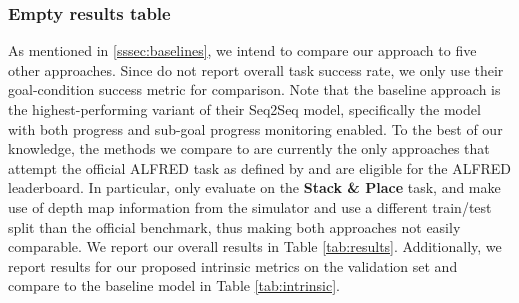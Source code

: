 \documentclass[11pt,a4paper]{article}
\begin{document}
\subsubsection{Empty results table}
As mentioned in \ref{sssec:baselines}, we intend to compare our approach to five other approaches. Since  do not report overall task success rate, we only use their goal-condition success metric for comparison. Note that the baseline approach is the highest-performing variant of their Seq2Seq model, specifically the model with both progress and sub-goal progress monitoring enabled. To the best of our knowledge, the methods we compare to are currently the only approaches that attempt the official ALFRED task as defined by  and are eligible for the ALFRED leaderboard.  In particular,  only evaluate on the \textbf{Stack \& Place} task, and  make use of depth map information from the simulator and use a different train/test split than the official benchmark, thus making both approaches not easily comparable. We report our overall results in Table \ref{tab:results}. Additionally, we report results for our proposed intrinsic metrics on the validation set and compare to the baseline model in Table \ref{tab:intrinsic}.
\end{document}

